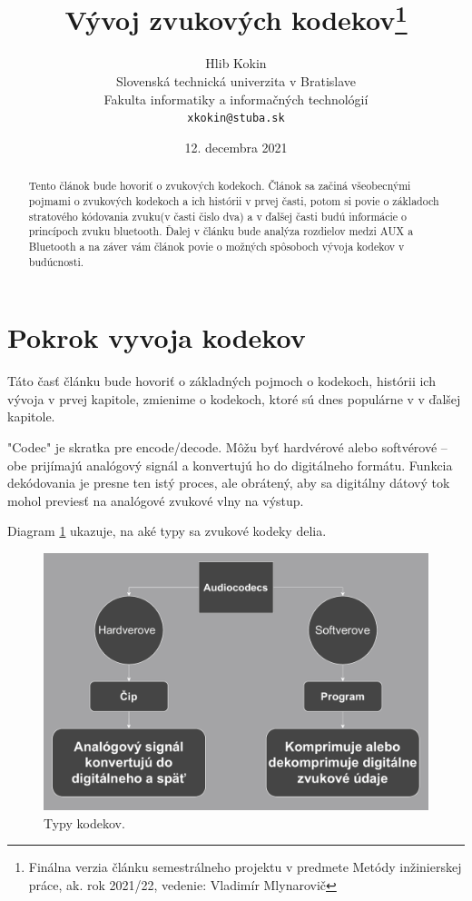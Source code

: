 \documentclass[10pt,twoside,slovak,a4paper]{article}
\title{Vývoj zvukových kodekov\thanks{Finálna verzia článku semestrálneho projektu v predmete Metódy inžinierskej práce, ak. rok 2021/22, vedenie: Vladimír Mlynarovič}}
\author{Hlib Kokin\\[2pt]
	{\small Slovenská technická univerzita v Bratislave}\\
	{\small Fakulta informatiky a informačných technológií}\\
	{\small \texttt{xkokin@stuba.sk}}
	}
\date{\small 12. decembra 2021}
\begin{document}
\maketitle

\begin{abstract}
Tento článok bude hovoriť o zvukových kodekoch. 
Článok sa  začiná všeobecnými pojmami o zvukových kodekoch a ich histórii v prvej časti, potom si povie o základoch stratového kódovania zvuku(v časti čislo dva) a v ďalšej časti budú informácie o princípoch zvuku bluetooth. Ďalej  v článku bude analýza rozdielov medzi AUX a Bluetooth a na záver vám článok povie o možných spôsoboch vývoja kodekov v budúcnosti. 
\end{abstract}
\newpage
\section{Pokrok vyvoja kodekov} \label{pokrok}

Táto časť článku bude hovoriť o základných pojmoch o kodekoch, histórii ich vývoja v prvej kapitole, zmienime o kodekoch, ktoré sú dnes populárne v v ďalšej kapitole.

"Codec" je skratka pre encode/decode. Môžu byť hardvérové alebo softvérové – obe prijímajú analógový signál a konvertujú ho do digitálneho formátu. Funkcia dekódovania je presne ten istý proces, ale obrátený, aby sa digitálny dátový tok mohol previesť na analógové zvukové vlny na výstup.\cite{Stephens}

Diagram \ref{f:rozhod1} ukazuje, na aké typy sa zvukové kodeky delia.
\begin{figure}[tbh]
\centering
\includegraphics[scale=0.5]{Typy_kodekov.pdf}
\caption{Typy kodekov.}
\label{f:rozhod1}
\end{figure}
\end{document}
